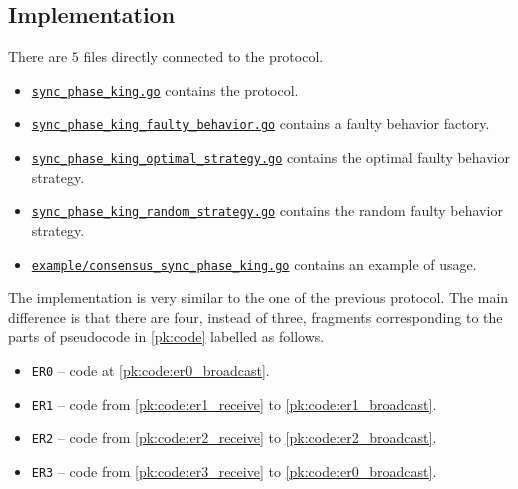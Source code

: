 \subsection{Implementation}
There are $5$ files directly connected to the protocol.
\begin{itemize}
    \item \href{https://github.com/krzysztof-turowski/distributed-framework/blob/6ec7e9cb9a870848f127c539d934b9da9c616ed6/consensus/sync_phase_king/sync_phase_king.go}{\texttt{sync\_phase\_king.go}} contains the protocol.
    \item \href{https://github.com/krzysztof-turowski/distributed-framework/blob/6ec7e9cb9a870848f127c539d934b9da9c616ed6/consensus/sync_phase_king/sync_phase_king_faulty_behavior.go}{\texttt{sync\_phase\_king\_faulty\_behavior.go}} contains a faulty behavior factory.
    \item \href{https://github.com/krzysztof-turowski/distributed-framework/blob/6ec7e9cb9a870848f127c539d934b9da9c616ed6/consensus/sync_phase_king/sync_phase_king_optimal_strategy.go}{\texttt{sync\_phase\_king\_optimal\_strategy.go}} contains the optimal faulty behavior strategy. 
    \item \href{https://github.com/krzysztof-turowski/distributed-framework/blob/6ec7e9cb9a870848f127c539d934b9da9c616ed6/consensus/sync_phase_king/sync_phase_king_random_strategy.go}{\texttt{sync\_phase\_king\_random\_strategy.go}}  contains the random faulty behavior strategy.
    \item \href{https://github.com/krzysztof-turowski/distributed-framework/blob/6ec7e9cb9a870848f127c539d934b9da9c616ed6/example/consensus_sync_phase_king.go}{\texttt{example/consensus\_sync\_phase\_king.go}} contains an example of usage.
\end{itemize}
The implementation is very similar to the one of the previous protocol. The main difference is that there are four, instead of three, fragments corresponding to the parts of pseudocode in \cref{pk:code} labelled as follows.
\begin{itemize}
    \item \texttt{ER0} -- code at \cref{pk:code:er0_broadcast}.
    \item \texttt{ER1} -- code from \cref{pk:code:er1_receive} to \cref{pk:code:er1_broadcast}.
    \item \texttt{ER2} -- code from \cref{pk:code:er2_receive} to \cref{pk:code:er2_broadcast}.
    \item \texttt{ER3} -- code from \cref{pk:code:er3_receive} to \cref{pk:code:er0_broadcast}.
\end{itemize}